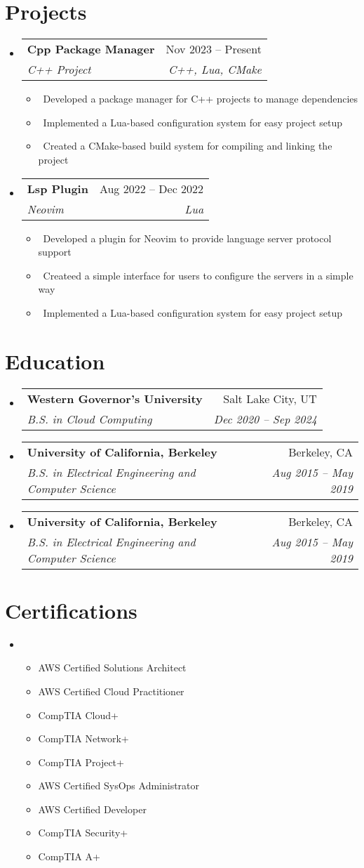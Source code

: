 \documentclass[letterpaper,10pt]{article}
\makeatletter
\newcommand{\resumeItem}[1]{\item\small{#1}}
\newcommand{\resumeSubheading}[4]{
\vspace{-1pt}\item
  \begin{tabular*}{0.97\textwidth}[t]{l@{\extracolsep{\fill}}r}
    \textbf{#1} & #2 \\
    \textit{#3} & \textit{#4} \\
  \end{tabular*}\vspace{-7pt}
}
\newcommand{\resumeSubHeadingList}{\begin{itemize}[leftmargin=0.15in, label={}]}
\newcommand{\resumeSubHeadingListEnd}{\end{itemize}}
\makeatother
\begin{document}
\section{Projects}
\resumeSubHeadingList
  \resumeSubheading
      {Cpp Package Manager}{Nov 2023 -- Present}
      {C++ Project}{C++, Lua, CMake}
      \resumeSubHeadingList
          \resumeItem{\textbullet\ Developed a package manager for C++ projects to manage dependencies}
          \resumeItem{\textbullet\ Implemented a Lua-based configuration system for easy project setup}
          \resumeItem{\textbullet\ Created a CMake-based build system for compiling and linking the project}
      \resumeSubHeadingListEnd
  \resumeSubheading
      {Lsp Plugin}{Aug 2022 -- Dec 2022} 
      {Neovim}{Lua}
      \resumeSubHeadingList
          \resumeItem{\textbullet\ Developed a plugin for Neovim to provide language server protocol support}
          \resumeItem{\textbullet\ Createed a simple interface for users to configure the servers in a simple way}
          \resumeItem{\textbullet\ Implemented a Lua-based configuration system for easy project setup}
      \resumeSubHeadingListEnd
\resumeSubHeadingListEnd

\section{Education}
\resumeSubHeadingList
  \resumeSubheading
      {Western Governor's University}{Salt Lake City, UT}
      {B.S. in Cloud Computing}{Dec 2020 -- Sep 2024}
  \resumeSubheading
      {University of California, Berkeley}{Berkeley, CA}
      {B.S. in Electrical Engineering and Computer Science}{Aug 2015 -- May 2019}
  \resumeSubheading
      {University of California, Berkeley}{Berkeley, CA}
      {B.S. in Electrical Engineering and Computer Science}{Aug 2015 -- May 2019}

\resumeSubHeadingListEnd
\pagebreak
\section{Certifications}
\resumeSubHeadingList
  \resumeItem{
  \begin{itemize}
    \item AWS Certified Solutions Architect
    \item AWS Certified Cloud Practitioner
    \item CompTIA Cloud+
    \item CompTIA Network+
    \item CompTIA Project+
    \item AWS Certified SysOps Administrator
    \item AWS Certified Developer
    \item CompTIA Security+
    \item CompTIA A+
  \end{itemize}}

\resumeSubHeadingListEnd
\end{document}
